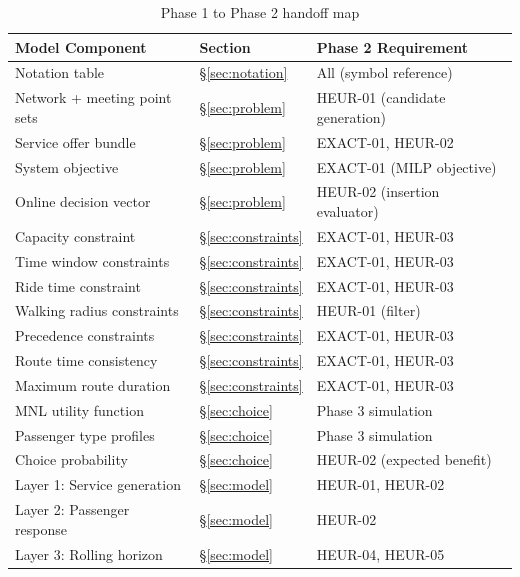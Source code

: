 \documentclass[12pt, a4paper]{article}
\begin{document}
\begin{table}[h]
\centering
\caption{Phase 1 to Phase 2 handoff map}
\label{tab:handoff}
\begin{tabular}{lll}
\toprule
Model Component & Section & Phase 2 Requirement \\
\midrule
Notation table & \S\ref{sec:notation} & All (symbol reference) \\
Network + meeting point sets & \S\ref{sec:problem} & HEUR-01 (candidate generation) \\
Service offer bundle & \S\ref{sec:problem} & EXACT-01, HEUR-02 \\
System objective & \S\ref{sec:problem} & EXACT-01 (MILP objective) \\
Online decision vector & \S\ref{sec:problem} & HEUR-02 (insertion evaluator) \\
Capacity constraint & \S\ref{sec:constraints} & EXACT-01, HEUR-03 \\
Time window constraints & \S\ref{sec:constraints} & EXACT-01, HEUR-03 \\
Ride time constraint & \S\ref{sec:constraints} & EXACT-01, HEUR-03 \\
Walking radius constraints & \S\ref{sec:constraints} & HEUR-01 (filter) \\
Precedence constraints & \S\ref{sec:constraints} & EXACT-01, HEUR-03 \\
Route time consistency & \S\ref{sec:constraints} & EXACT-01, HEUR-03 \\
Maximum route duration & \S\ref{sec:constraints} & EXACT-01, HEUR-03 \\
MNL utility function & \S\ref{sec:choice} & Phase 3 simulation \\
Passenger type profiles & \S\ref{sec:choice} & Phase 3 simulation \\
Choice probability & \S\ref{sec:choice} & HEUR-02 (expected benefit) \\
Layer 1: Service generation & \S\ref{sec:model} & HEUR-01, HEUR-02 \\
Layer 2: Passenger response & \S\ref{sec:model} & HEUR-02 \\
Layer 3: Rolling horizon & \S\ref{sec:model} & HEUR-04, HEUR-05 \\
\bottomrule
\end{tabular}
\end{table}
\end{document}
